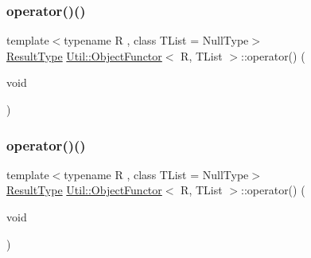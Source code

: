 \subsubsection{\texorpdfstring{operator()()}{operator()()}\hspace{0.1cm}{\footnotesize\ttfamily [2/18]}}
{\footnotesize\ttfamily template$<$typename R , class T\+List  = Null\+Type$>$ \\
\mbox{\hyperlink{classUtil_1_1ObjectFunctor_a77f816e98108848347d0dfc085090a1c}{Result\+Type}} \mbox{\hyperlink{classUtil_1_1ObjectFunctor}{Util\+::\+Object\+Functor}}$<$ R, T\+List $>$\+::operator() (\begin{DoxyParamCaption}\item[{void}]{ }\end{DoxyParamCaption})\hspace{0.3cm}{\ttfamily [inline]}}

\mbox{\label{classUtil_1_1ObjectFunctor_a47ff83bbdf075aefe2ee26aafafd88a1}} 
\subsubsection{\texorpdfstring{operator()()}{operator()()}\hspace{0.1cm}{\footnotesize\ttfamily [3/18]}}
{\footnotesize\ttfamily template$<$typename R , class T\+List  = Null\+Type$>$ \\
\mbox{\hyperlink{classUtil_1_1ObjectFunctor_a77f816e98108848347d0dfc085090a1c}{Result\+Type}} \mbox{\hyperlink{classUtil_1_1ObjectFunctor}{Util\+::\+Object\+Functor}}$<$ R, T\+List $>$\+::operator() (\begin{DoxyParamCaption}\item[{void}]{ }\end{DoxyParamCaption})\hspace{0.3cm}{\ttfamily [inline]}}

\mbox{\label{classUtil_1_1ObjectFunctor_affe11b4a42e49e60ac921c2353e3ce18}} 
